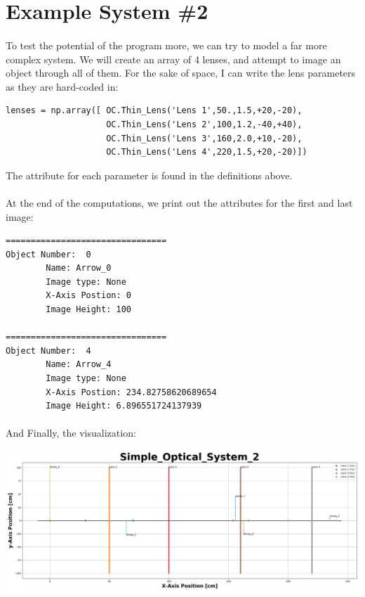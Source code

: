 \documentclass[12pt,letterpaper]{article}
\begin{document}

\section{Example System \#2}
\paragraph*{}To test the potential of the program more, we can try to model a far more complex system. We will create an array of 4 lenses, and attempt to image an object through all of them. For the sake of space, I can write the lens parameters as they are hard-coded in:
\begin{verbatim}
lenses = np.array([ OC.Thin_Lens('Lens 1',50.,1.5,+20,-20),
                    OC.Thin_Lens('Lens 2',100,1.2,-40,+40),
                    OC.Thin_Lens('Lens 3',160,2.0,+10,-20),                     
                    OC.Thin_Lens('Lens 4',220,1.5,+20,-20)]) 
\end{verbatim}
The attribute for each parameter is found in the definitions above.
\paragraph*{}At the end of the computations, we print out the attributes for the first and last image:
\begin{verbatim}
================================
Object Number:  0
        Name: Arrow_0
        Image type: None
        X-Axis Postion: 0
        Image Height: 100

================================
Object Number:  4
        Name: Arrow_4
        Image type: None
        X-Axis Postion: 234.82758620689654
        Image Height: 6.896551724137939
\end{verbatim}
\paragraph*{}And Finally, the visualization:
\begin{center}
\includegraphics[scale=0.34]{Simple_Optical_System_2}
\end{center}
\end{document}
